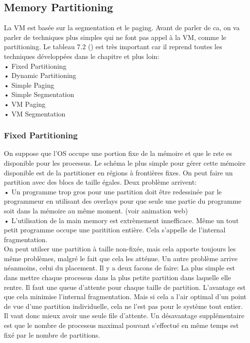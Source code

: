\subsection{Memory Partitioning}
La VM est basée sur la segmentation et le paging.
Avant de parler de ca, on va parler de techniques plus simples qui ne font pas appel à la VM, comme le partitioning.
Le tableau 7.2 (\cite[p.~311]{stallings}) est très important car il reprend toutes les techniques développées dans le chapitre et plus loin: \\
• Fixed Partitioning \\
• Dynamic Partitioning \\
• Simple Paging \\
• Simple Segmentation \\
• VM Paging \\
• VM Segmentation \\
\subsubsection{Fixed Partitioning}
On suppose que l'OS occupe une portion fixe de la mémoire et que le rste es disponible pour les processus.
Le schéma le plus simple pour gérer cette mémoire disponible est de la partitioner en régions à frontières fixes.
On peut faire un partition avec des blocs de taille égales.
Deux problème arrivent: \\
• Un programme trop gros pour une partition doit être redessinée par le programmeur en utilisant des overlays pour que seule une partie du programme soit dans la mémoire au même moment.
(voir animation web) \\
• L'utilisation de la main memory est extrèmement innefficace.
Même un tout petit programme occupe une paritition entière.
Cela s'appelle de l'internal fragmentation.
\\
On peut utilser une partition à taille non-fixée, mais cela apporte toujours les même problèmes, malgré le fait que cela les atténue.
Un autre problème arrive néanmoins, celui du placement.
Il y a deux facons de faire: La plus simple est dans mettre chaque processus dans la plus petite partition dans laquelle elle rentre.
Il faut une queue d'attente pour chaque taille de partition.
L'avantage est que cela minimise l'internal fragmentation.
Mais si cela a l'air optimal d'un point de vue d'une partition individuelle, cela ne l'est pas pour le système tout entier.
Il vaut donc mieux avoir une seule file d'attente.
Un désavantage supplémentaire est que le nombre de processus maximal pouvant s'effectué en même temps est fixé par le nombre de partitions.
